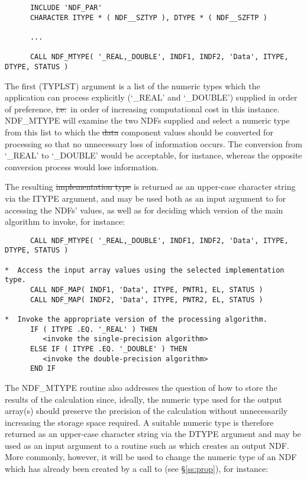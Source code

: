 \small
\begin{verbatim}
      INCLUDE 'NDF_PAR'
      CHARACTER ITYPE * ( NDF__SZTYP ), DTYPE * ( NDF__SZFTP )

      ...

      CALL NDF_MTYPE( '_REAL,_DOUBLE', INDF1, INDF2, 'Data', ITYPE, DTYPE, STATUS )
\end{verbatim}
\normalsize

The first (TYPLST) argument is a list of the numeric types which the
application can process explicitly (`\_REAL' and `\_DOUBLE') supplied in
order of preference, \st{i.e.}\ in order of increasing computational cost in
this instance. 
NDF\_MTYPE will examine the two NDFs supplied and select a numeric type from
this list to which the \st{data\/} component values should be converted for
processing so that no unnecessary loss of information occurs.
The conversion from `\_REAL' to `\_DOUBLE' would be acceptable, for
instance, whereas the opposite conversion process would lose information. 

The resulting \st{implementation type\/} is returned as an upper-case
character string via the ITYPE argument, and may be used both as an input
argument to  for accessing the NDFs' values, as well as for deciding
which version of the main algorithm to invoke, for instance: 

\small
\begin{verbatim}
      CALL NDF_MTYPE( '_REAL,_DOUBLE', INDF1, INDF2, 'Data', ITYPE, DTYPE, STATUS )

*  Access the input array values using the selected implementation type.
      CALL NDF_MAP( INDF1, 'Data', ITYPE, PNTR1, EL, STATUS )
      CALL NDF_MAP( INDF2, 'Data', ITYPE, PNTR2, EL, STATUS )

*  Invoke the appropriate version of the processing algorithm.
      IF ( ITYPE .EQ. '_REAL' ) THEN
         <invoke the single-precision algorithm>
      ELSE IF ( ITYPE .EQ. '_DOUBLE' ) THEN
         <invoke the double-precision algorithm>
      END IF
\end{verbatim}
\normalsize

The NDF\_MTYPE routine also addresses the question of how to store the
results of the calculation since, ideally, the numeric type used for the
output array(s) should preserve the precision of the calculation without
unnecessarily increasing the storage space required. 
A suitable numeric type is therefore returned as an upper-case character
string via the DTYPE argument and may be used as an input argument to a
routine such as  which creates an output NDF. 
More commonly, however, it will be used to change the numeric type of an NDF
which has already been created by a call to  (see \S\ref{ss:prop}),
for instance: 

